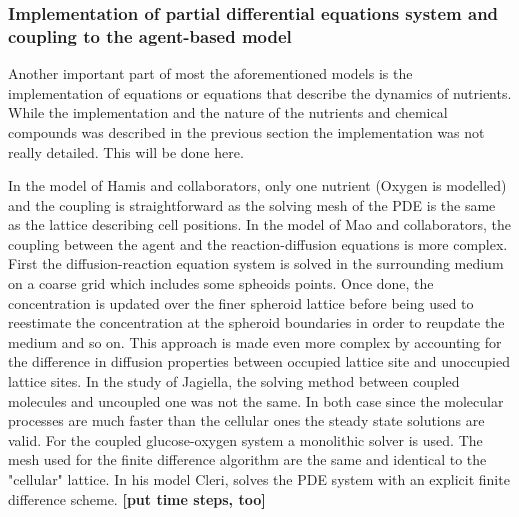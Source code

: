 \documentclass[11pt,a4paper]{article}
\begin{document}

\subsubsection{Implementation of partial differential equations system and coupling to the agent-based model}
Another important part of most the aforementioned models is the implementation of equations or equations that describe the dynamics of nutrients. While the implementation and the nature of the nutrients and chemical compounds was described in the previous section the implementation was not really detailed. This will be done here.

In the model of Hamis and collaborators, only one nutrient (Oxygen is modelled) and the coupling is straightforward as the solving mesh of the PDE is the same as the lattice describing cell positions.\cite{Hamis2020} In the model of Mao and collaborators, the coupling between the agent and the reaction-diffusion equations is more complex. First the diffusion-reaction equation system is solved in the surrounding medium on a coarse grid which includes some spheoids points. Once done, the concentration is updated over the finer spheroid lattice before being used to reestimate the concentration at the spheroid boundaries in order to reupdate the medium and so on.\cite{Mao2018} This approach is made even more complex by accounting for the difference in diffusion properties between occupied lattice site and unoccupied lattice sites. In the study of Jagiella, the solving method between coupled molecules and uncoupled one was not the same. In both case since the molecular processes are much faster than the cellular ones the steady state solutions are valid. For the coupled glucose-oxygen system a monolithic solver is used.\cite{Jagiella2016} The mesh used for the finite difference algorithm are the same and identical to the "cellular" lattice. In his model Cleri, solves the PDE system with an explicit finite difference scheme.\cite{Cleri2019} \textbf{[put time steps, too]}
\end{document}
